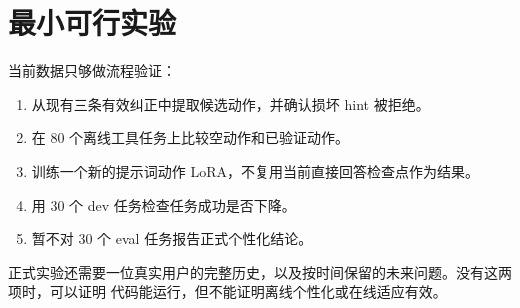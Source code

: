 \documentclass[11pt,UTF8,fontset=fandol]{ctexart}
\begin{document}
\section{最小可行实验}

当前数据只够做流程验证：
\begin{enumerate}
  \item 从现有三条有效纠正中提取候选动作，并确认损坏 hint 被拒绝。
  \item 在 80 个离线工具任务上比较空动作和已验证动作。
  \item 训练一个新的提示词动作 LoRA，不复用当前直接回答检查点作为结果。
  \item 用 30 个 dev 任务检查任务成功是否下降。
  \item 暂不对 30 个 eval 任务报告正式个性化结论。
\end{enumerate}

正式实验还需要一位真实用户的完整历史，以及按时间保留的未来问题。没有这两项时，可以证明
代码能运行，但不能证明离线个性化或在线适应有效。
\end{document}
